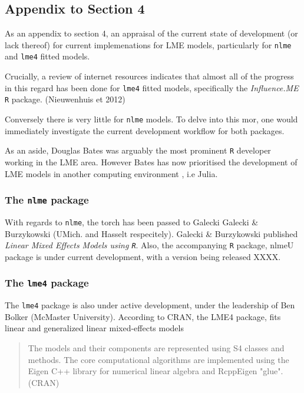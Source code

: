 \documentclass[12pt, a4paper]{report}
\theoremstyle{plain}
\theoremstyle{definition}
\theoremstyle{remark}
\begin{document}
\newpage
\subsection*{Appendix to Section 4}

As an appendix to section 4, an appraisal of the current state of development (or lack thereof) for current implemenations for LME models, particularly for
\texttt{nlme} and \texttt{lme4} fitted models.

Crucially, a review of internet resources indicates that almost all of the progress in this regard has been done for \texttt{lme4} fitted models, specifically the \textit{Influence.ME} \texttt{R} package. (Nieuwenhuis et 2012)

Conversely there is very little for \texttt{nlme} models. To delve into this mor, one would immediately investigate the current development workflow for both packages.


As an aside, Douglas Bates was arguably the most prominent \texttt{R} developer working in the LME area. 
However Bates has now prioritised the development of LME models in another computing environment , i.e Julia. 

\subsubsection*{The \texttt{nlme} package}

With regards to \texttt{nlme}, the torch has been passed to Galecki Galecki \& Burzykowski (UMich. and Hasselt respecitely).  Galecki \& Burzykowski published \textit{Linear Mixed Effects Models using \texttt{R}}. 
Also, the accompanying \texttt{R} package, nlmeU package is under current development, with a version being released XXXX.


\subsubsection*{The \texttt{lme4} package}

The \texttt{lme4} package is also under active development, under the leadership of Ben Bolker (McMaster University). According to CRAN, the LME4 package, fits linear and generalized linear mixed-effects models

\begin{quote}
	The models and their components are represented using S4 classes and methods. The core computational algorithms are implemented using the Eigen C++ library for numerical linear algebra and RcppEigen "glue".
	(CRAN)
\end{quote}
\end{document}
